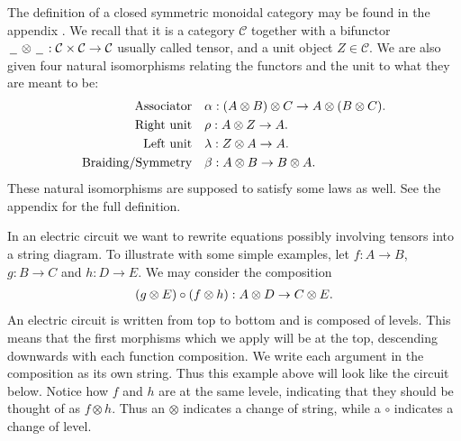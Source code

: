 \documentclass[../thesis.tex]{subfiles}
\begin{document}
            The definition of a closed symmetric monoidal category may be found in the appendix . We recall that it is a category $\mathcal{C}$ together with a bifunctor $\argument\otimes\argument : \mathcal{C}\times\mathcal{C}\rightarrow\mathcal{C}$ usually called tensor, and a unit object $Z\in \mathcal{C}$. We are also given four natural isomorphisms relating the functors and the unit to what they are meant to be:
            \begin{align*}
                \tt{Associator} & \quad \alpha : (A \otimes B) \otimes C \rightarrow A \otimes (B \otimes C)\tt{.}\\
                \tt{Right unit} & \quad \rho : A \otimes Z \rightarrow A\tt{.}\\
                \tt{Left unit} & \quad \lambda : Z \otimes A \rightarrow A\tt{.}\\
                \tt{Braiding/Symmetry} & \quad \beta : A \otimes B \rightarrow B \otimes A\tt{.}
            \end{align*}
            These natural isomorphisms are supposed to satisfy some laws as well. See the appendix for the full definition.

            In an electric circuit we want to rewrite equations possibly involving tensors into a string diagram. To illustrate with some simple examples, let $f : A \rightarrow B$, $g : B \rightarrow C$ and $h : D \rightarrow E$. We may consider the composition
            \begin{align*}
                (g \otimes E) \circ (f \otimes h) : A \otimes D \rightarrow C \otimes E \tt{.}
            \end{align*}
            An electric circuit is written from top to bottom and is composed of levels. This means that the first morphisms which we apply will be at the top, descending downwards with each function composition. We write each argument in the composition as its own string. Thus this example above will look like the circuit below. Notice how $f$ and $h$ are at the same levele, indicating that they should be thought of as $f \otimes h$. Thus an $\otimes$ indicates a change of string, while a $\circ$ indicates a change of level.
            
\end{document}
